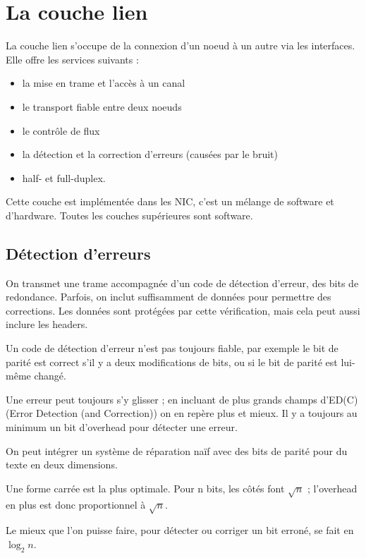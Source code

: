 \chapter{La couche lien}

La couche lien s'occupe de la connexion d'un noeud à un autre via les interfaces. Elle offre les services suivants :

\begin{itemize}
\item la mise en trame et l'accès à un canal
\item le transport fiable entre deux noeuds
\item le contrôle de flux
\item la détection et la correction d'erreurs (causées par le bruit)
\item half- et full-duplex.
\end{itemize}

Cette couche est implémentée dans les NIC, c'est un mélange de software et d'hardware. Toutes les couches supérieures sont software.

\section{Détection d'erreurs}

On transmet une trame accompagnée d'un code de détection d'erreur, des bits de redondance. Parfois, on inclut suffisamment de données pour permettre des corrections. Les données sont protégées par cette vérification, mais cela peut aussi inclure les headers.


Un code de détection d'erreur n'est pas toujours fiable, par exemple le bit de parité est correct s'il y a deux modifications de bits, ou si le bit de parité est lui-même changé.

Une erreur peut toujours s'y glisser ; en incluant de plus grands champs d'ED(C) (Error Detection (and Correction)) on en repère plus et mieux. Il y a toujours au minimum un bit d'overhead pour détecter une erreur.

On peut intégrer un système de réparation naïf avec des bits de parité pour du texte en deux dimensions.


Une forme carrée est la plus optimale. Pour n bits, les côtés font $\sqrt{n}$ ;  l'overhead en plus est donc proportionnel à $\sqrt{n}$.

Le mieux que l'on puisse faire, pour détecter ou corriger un bit erroné, se fait en $\log_2n$.

